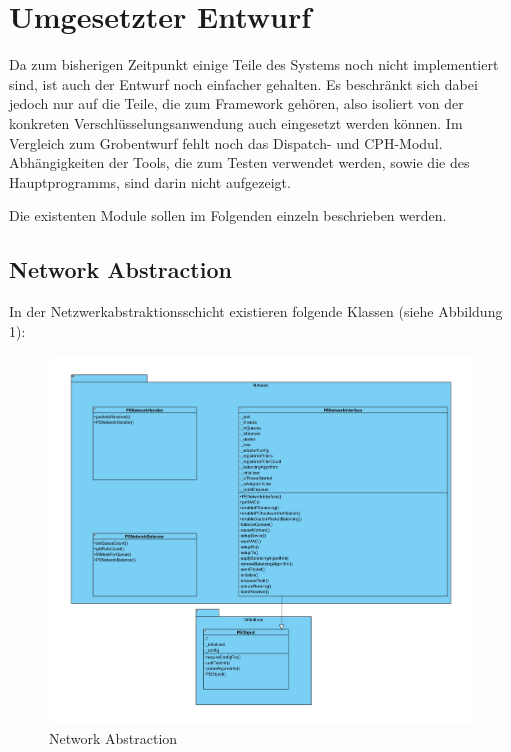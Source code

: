 \documentclass[a4paper, 11pt, ngerman, fleqn]{article}
\begin{document}
\clearpage
\section{Umgesetzter Entwurf}

Da zum bisherigen Zeitpunkt einige Teile des Systems noch nicht implementiert sind, ist auch der Entwurf noch einfacher gehalten.
Es beschränkt sich dabei jedoch nur auf die Teile, die zum Framework gehören, also isoliert von der konkreten Verschlüsselungsanwendung auch eingesetzt werden können.
Im Vergleich zum Grobentwurf fehlt noch das Dispatch- und CPH-Modul. 
Abhängigkeiten der Tools, die zum Testen verwendet werden, sowie die des Hauptprogramms, sind darin nicht aufgezeigt.

Die existenten Module sollen im Folgenden einzeln beschrieben werden.

\subsection{Network Abstraction}
In der Netzwerkabstraktionsschicht existieren folgende Klassen (siehe Abbildung 1):

\begin{figure}
	\begin{center}
		\includegraphics[width=1 \textwidth]{figures/Network.pdf}
		\caption{Network Abstraction}
	\end{center}
\end{figure}
\end{document}

